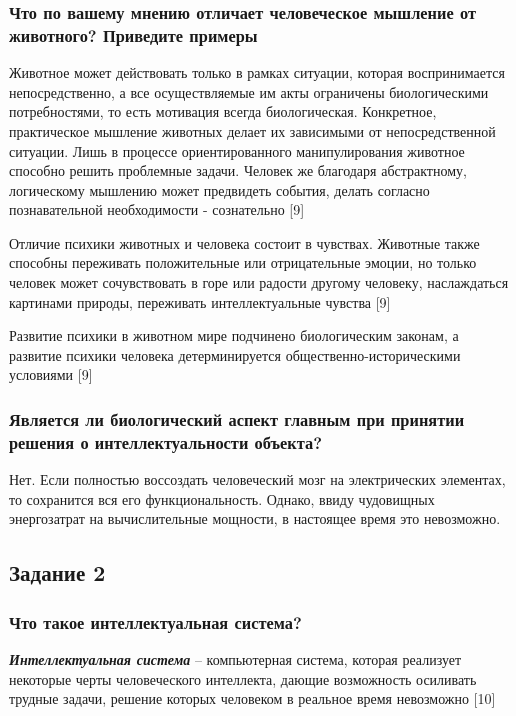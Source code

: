 \documentclass[14pt,a4paper,report]{report}
\begin{document}
\subsubsection{Что по вашему мнению отличает человеческое мышление от животного? Приведите примеры}

Животное может действовать только в рамках ситуации, которая воспринимается непосредственно, а все осуществляемые им акты ограничены биологическими потребностями, то есть мотивация всегда биологическая. Конкретное, практическое мышление животных делает их зависимыми от непосредственной ситуации. Лишь в процессе ориентированного манипулирования животное способно решить проблемные задачи. Человек же благодаря абстрактному, логическому мышлению может предвидеть события, делать согласно познавательной необходимости - сознательно [9]

Отличие психики животных и человека состоит в чувствах. Животные также способны переживать положительные или отрицательные эмоции, но только человек может сочувствовать в горе или радости другому человеку, наслаждаться картинами природы, переживать интеллектуальные чувства [9]

Развитие психики в животном мире подчинено биологическим законам, а развитие психики человека детерминируется общественно-историческими условиями [9]

\subsubsection{Является ли биологический аспект главным при принятии решения о интеллектуальности объекта?}

Нет. Если полностью воссоздать человеческий мозг на электрических элементах, то сохранится вся его функциональность. Однако, ввиду чудовищных энергозатрат на вычислительные мощности, в настоящее время это невозможно.

\subsection{Задание 2}

\subsubsection{Что такое интеллектуальная система?}

\emph{\textbf{Интеллектуальная система}} -- компьютерная система, которая реализует некоторые черты человеческого интеллекта, дающие возможность осиливать трудные задачи, решение которых человеком в реальное время невозможно [10] 
\end{document}
